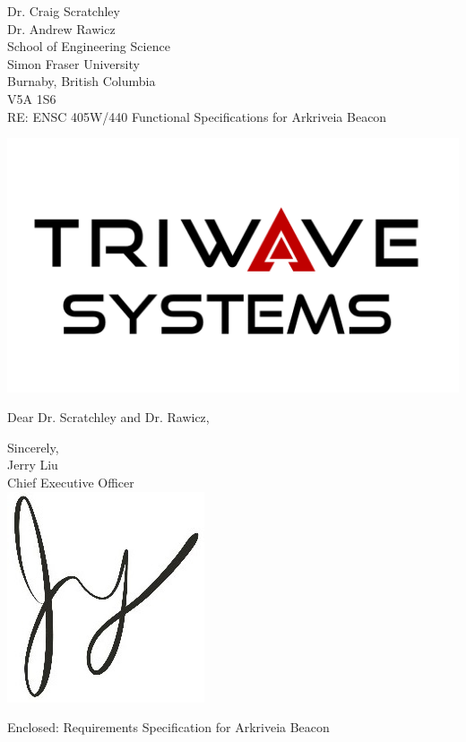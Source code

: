 \documentclass[11pt]{letter}
\date{July 7, 2019}
\begin{document}
\begin{letter}{
Dr. Craig Scratchley\\
Dr. Andrew Rawicz\\
School of Engineering Science\\
Simon Fraser University\\
Burnaby, British Columbia\\
V5A 1S6\\
\bigskip
RE: ENSC 405W/440 Functional Specifications for Arkriveia Beacon\\
} 


\begin{center}
\includegraphics[scale=0.25]{./images/logo_W.png}
\end{center}


\opening{Dear Dr. Scratchley and Dr. Rawicz,} 
 
 
 
 
 
\medskip
Sincerely,\\
Jerry Liu\\
Chief Executive Officer\\

\vspace*{-0.25cm}
\includegraphics[scale=0.8]{./images/signature.jpg}

{Enclosed: Requirements Specification for Arkriveia Beacon}

\end{letter}
\end{document}
